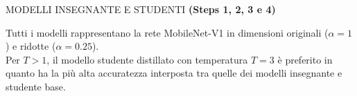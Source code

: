 \begin{frame}{MODELLI INSEGNANTE E STUDENTI}
  {\bfseries{\scriptsize{(Steps 1, 2, 3 e 4)}}}
  \renewcommand{\thefootnote}{\fnsymbol{footnote}}
  \begin{minipage}{\linewidth}
    \centering
    \begin{minipage}{0.45\linewidth}
      Tutti i modelli rappresentano la rete MobileNet-V1 in dimensioni originali ($\alpha=1$) e ridotte ($\alpha=0.25$).\\ 
      Per $T>1$, il modello studente distillato con temperatura $T=3$ è preferito in quanto ha la più alta accuratezza interposta tra quelle dei modelli insegnante e studente base.
    \end{minipage}
    \hspace{0.3cm}
    \begin{minipage}{0.50\linewidth}
      \begin{center}
\end{center}
\end{minipage}
\end{minipage}
\end{frame}
